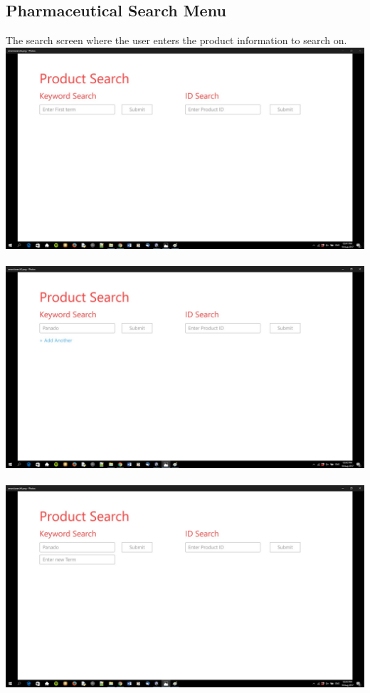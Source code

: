 \documentclass[a4paper,10pt]{article}
\begin{document}
	\subsection{Pharmaceutical Search Menu}
	The search screen where the user enters the product information to search on. \\
	{\centering\includegraphics[width=15cm, scale=0.5]{smarctsearch2.jpg}} \\ \\
	{\centering\includegraphics[width=15cm, scale=0.5]{smarctsearch3.jpg}} \\ \\
	{\centering\includegraphics[width=15cm, scale=0.5]{smarctsearch4.jpg}} \\ \\
\end{document}

